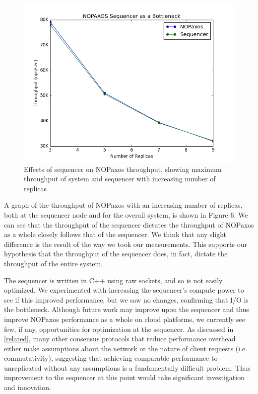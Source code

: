 \begin{figure}[tp]
\centering
\includegraphics[scale=0.5]{figures/final_SeqBottleneck.png}
\caption{Effects of sequencer on NOPaxos throughput, showing maximum throughput of system and sequencer with increasing number of replicas}
\end{figure}

A graph of the throughput of NOPaxos with an increasing number of replicas, both at the sequencer node and for the overall system, is shown in Figure 6. We can see that the throughput of the sequencer dictates the throughput of NOPaxos as a whole closely follows that of the sequencer. We think that any slight difference is the result of the way we took our measurements. This supports our hypothesis that the throughput of the sequencer does, in fact, dictate the throughput of the entire system. 

The sequencer is written in C++ using raw sockets, and so is not easily optimized. We experimented with increasing the sequencer's compute power to see if this improved performance, but we saw no changes, confirming that I/O is the bottleneck. Although future work may improve upon the sequencer and thus improve NOPaxos performance as a whole on cloud platforms, we currently see few, if any, opportunities for optimization at the sequencer. As discussed in \ref{related}, many other consensus protocols that reduce performance overhead either make assumptions about the network or the nature of client requests (i.e. commutativity), suggesting that achieving comparable performance to unreplicated without any assumptions is a fundamentally difficult problem. Thus improvement to the sequencer at this point would take significant investigation and innovation. 